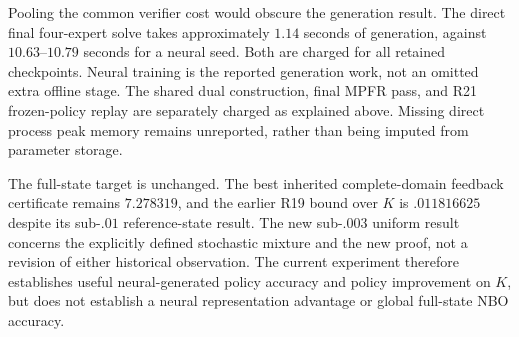 
Pooling the common verifier cost would obscure the generation result. The direct final four-expert solve takes approximately $1.14$ seconds of generation, against $10.63$--$10.79$ seconds for a neural seed. Both are charged for all retained checkpoints. Neural training is the reported generation work, not an omitted extra offline stage. The shared dual construction, final MPFR pass, and R21 frozen-policy replay are separately charged as explained above. Missing direct process peak memory remains unreported, rather than being imputed from parameter storage.

The full-state target is unchanged. The best inherited complete-domain feedback certificate remains $7.278319$, and the earlier R19 bound over $K$ is $.011816625$ despite its sub-$.01$ reference-state result. The new sub-$.003$ uniform result concerns the explicitly defined stochastic mixture and the new proof, not a revision of either historical observation. The current experiment therefore establishes useful neural-generated policy accuracy and policy improvement on $K$, but does not establish a neural representation advantage or global full-state NBO accuracy.
